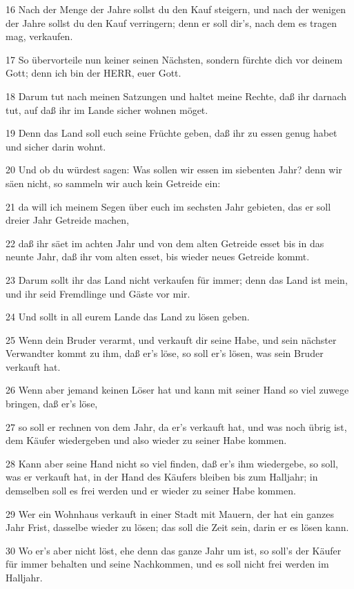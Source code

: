 \par 16 Nach der Menge der Jahre sollst du den Kauf steigern, und nach der wenigen der Jahre sollst du den Kauf verringern; denn er soll dir's, nach dem es tragen mag, verkaufen.
\par 17 So übervorteile nun keiner seinen Nächsten, sondern fürchte dich vor deinem Gott; denn ich bin der HERR, euer Gott.
\par 18 Darum tut nach meinen Satzungen und haltet meine Rechte, daß ihr darnach tut, auf daß ihr im Lande sicher wohnen möget.
\par 19 Denn das Land soll euch seine Früchte geben, daß ihr zu essen genug habet und sicher darin wohnt.
\par 20 Und ob du würdest sagen: Was sollen wir essen im siebenten Jahr? denn wir säen nicht, so sammeln wir auch kein Getreide ein:
\par 21 da will ich meinem Segen über euch im sechsten Jahr gebieten, das er soll dreier Jahr Getreide machen,
\par 22 daß ihr säet im achten Jahr und von dem alten Getreide esset bis in das neunte Jahr, daß ihr vom alten esset, bis wieder neues Getreide kommt.
\par 23 Darum sollt ihr das Land nicht verkaufen für immer; denn das Land ist mein, und ihr seid Fremdlinge und Gäste vor mir.
\par 24 Und sollt in all eurem Lande das Land zu lösen geben.
\par 25 Wenn dein Bruder verarmt, und verkauft dir seine Habe, und sein nächster Verwandter kommt zu ihm, daß er's löse, so soll er's lösen, was sein Bruder verkauft hat.
\par 26 Wenn aber jemand keinen Löser hat und kann mit seiner Hand so viel zuwege bringen, daß er's löse,
\par 27 so soll er rechnen von dem Jahr, da er's verkauft hat, und was noch übrig ist, dem Käufer wiedergeben und also wieder zu seiner Habe kommen.
\par 28 Kann aber seine Hand nicht so viel finden, daß er's ihm wiedergebe, so soll, was er verkauft hat, in der Hand des Käufers bleiben bis zum Halljahr; in demselben soll es frei werden und er wieder zu seiner Habe kommen.
\par 29 Wer ein Wohnhaus verkauft in einer Stadt mit Mauern, der hat ein ganzes Jahr Frist, dasselbe wieder zu lösen; das soll die Zeit sein, darin er es lösen kann.
\par 30 Wo er's aber nicht löst, ehe denn das ganze Jahr um ist, so soll's der Käufer für immer behalten und seine Nachkommen, und es soll nicht frei werden im Halljahr.
